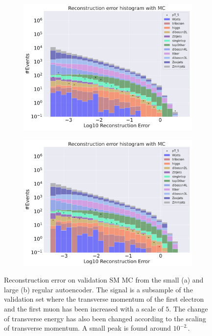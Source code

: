 \begin{figure}[H]
    \centering
    \begin{subfigure}{.45\textwidth}
        \includegraphics[width=\textwidth]{Figures/AE_testing/small/b_data_recon_big_rm3_feats_sig_pT_5.pdf}
        \caption{ }
        \label{fig:ae_small_pt_5}
    \end{subfigure}
    \hfill 
    \begin{subfigure}{.45\textwidth}
        \includegraphics[width=\textwidth]{Figures/AE_testing/big/b_data_recon_big_rm3_feats_sig_pT_5.pdf}
        \caption{}
        \label{fig:ae_big_pt_5}
    \end{subfigure}
    \hfill 
    \caption[AE | Reconstruction error $p_T$ altering of 5]{Reconstruction error on validation SM MC from the small (a) and large (b) regular autoencoder. The signal is a subsample of the validation 
    set where the transverse momentum of the first electron and the first muon has been increased with a scale of $5$. The change of transverse 
    energy has also been changed according to the scaling of transverse momentum. A small peak is found around $10^{-2.}$. }
    \label{fig:ae_big_small_pt_5}
\end{figure}


